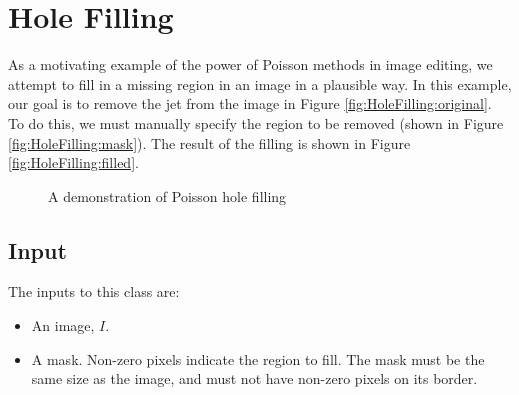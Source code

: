 \documentclass{InsightArticle}
\begin{document}
\section{Hole Filling}
As a motivating example of the power of Poisson methods in image editing, we attempt to fill in a missing region in an image in a plausible way. In this example, our goal is to remove the jet from the image in Figure \ref{fig:HoleFilling:original}. To do this, we must manually specify the region to be removed (shown in Figure \ref{fig:HoleFilling:mask}). The result of the filling is shown in Figure \ref{fig:HoleFilling:filled}.

\begin{figure}[H]
\centering
{}
\caption{A demonstration of Poisson hole filling}
\label{fig:HoleFilling}
\end{figure}

\subsection{Input}
The inputs to this class are:
\begin{itemize}
\item An image, $I$.
\item A mask. Non-zero pixels indicate the region to fill. The mask must be the same size as the image, and must not have non-zero pixels on its border.
\end{itemize}
\end{document}
